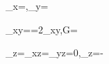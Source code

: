 \varepsilon_x=,\qquad \varepsilon_y=

\gamma_{xy}==2\varepsilon_{xy},\qquad G=

\sigma_z=\tau_{xz}=\tau_{yz}=0,\qquad \varepsilon_z=-
